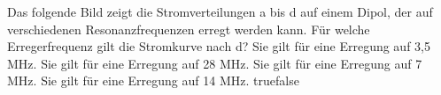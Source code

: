     {Das folgende Bild zeigt die Stromverteilungen a bis d auf einem Dipol, der auf verschiedenen Resonanzfrequenzen erregt werden kann. Für welche Erregerfrequenz gilt die Stromkurve nach d?}
    {Sie gilt für eine Erregung auf 3,5 MHz.}
    {Sie gilt für eine Erregung auf 28 MHz.}
    {Sie gilt für eine Erregung auf 7 MHz.}
    {Sie gilt für eine Erregung auf 14 MHz.}
    {true}{false}